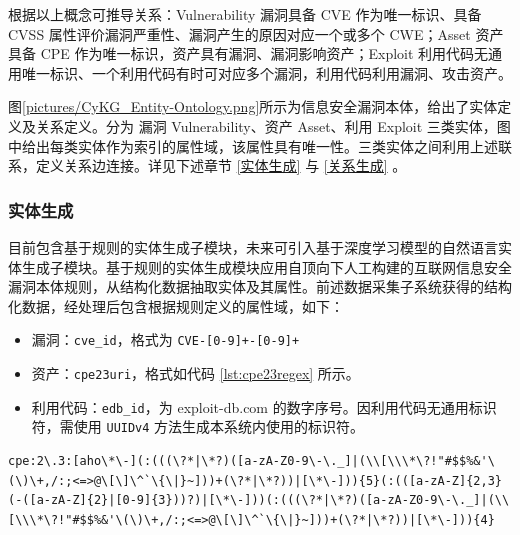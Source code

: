 \documentclass[a4paper,AutoFakeBold,oneside,12pt]{book}
\begin{document}
根据以上概念可推导关系：Vulnerability 漏洞具备 CVE 作为唯一标识、具备 CVSS 属性评价漏洞严重性、漏洞产生的原因对应一个或多个 CWE；Asset 资产具备 CPE 作为唯一标识，资产具有漏洞、漏洞影响资产；Exploit 利用代码无通用唯一标识、一个利用代码有时可对应多个漏洞，利用代码利用漏洞、攻击资产。

图\ref{pictures/CyKG_Entity-Ontology.png}所示为信息安全漏洞本体，给出了实体定义及关系定义。分为  漏洞 Vulnerability、资产 Asset、利用 Exploit 三类实体，图中给出每类实体作为索引的属性域，该属性具有唯一性。三类实体之间利用上述联系，定义关系边连接。详见下述章节 \ref{实体生成} 与 \ref{关系生成} 。


\subsubsection{实体生成\label{实体生成}}

目前包含基于规则的实体生成子模块，未来可引入基于深度学习模型的自然语言实体生成子模块。基于规则的实体生成模块应用自顶向下人工构建的互联网信息安全漏洞本体规则，从结构化数据抽取实体及其属性。前述数据采集子系统获得的结构化数据，经处理后包含根据规则定义的属性域，如下：
\begin{itemize}
	\item 漏洞：\lstinline|cve_id|，格式为 \lstinline|CVE-[0-9]+-[0-9]+|
	\item 资产：\lstinline|cpe23uri|，格式如代码 \ref{lst:cpe23regex} 所示。
	\item 利用代码：\lstinline|edb_id|，为 exploit-db.com 的数字序号。因利用代码无通用标识符，需使用 \lstinline|UUIDv4| 方法生成本系统内使用的标识符。
\end{itemize}

\begin{lstlisting}[caption={CPE 2.3 格式正则表达式},label={lst:cpe23regex},breaklines,style=lgeneral]
	cpe:2\.3:[aho\*\-](:(((\?*|\*?)([a-zA-Z0-9\-\._]|(\\[\\\*\?!"#$$%&'\(\)\+,/:;<=>@\[\]\^`\{\|}~]))+(\?*|\*?))|[\*\-])){5}(:(([a-zA-Z]{2,3}(-([a-zA-Z]{2}|[0-9]{3}))?)|[\*\-]))(:(((\?*|\*?)([a-zA-Z0-9\-\._]|(\\[\\\*\?!"#$$%&'\(\)\+,/:;<=>@\[\]\^`\{\|}~]))+(\?*|\*?))|[\*\-])){4}
\end{lstlisting}
\end{document}
